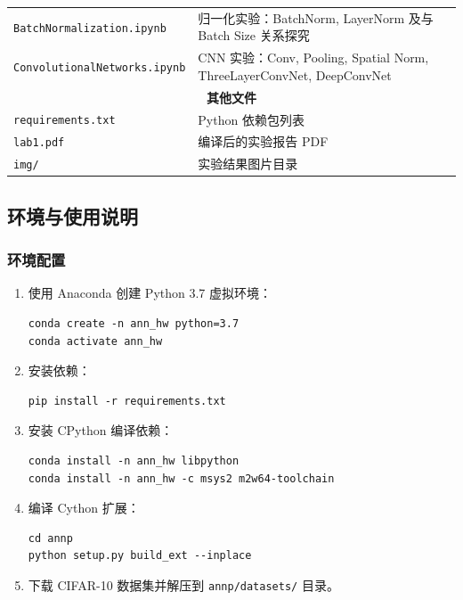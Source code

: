 \documentclass[a4paper]{article}
\begin{document}
\begin{longtable}{l|l}
\texttt{BatchNormalization.ipynb} & 归一化实验：BatchNorm, LayerNorm 及与 Batch Size 关系探究 \\
\texttt{ConvolutionalNetworks.ipynb} & CNN 实验：Conv, Pooling, Spatial Norm, ThreeLayerConvNet, DeepConvNet \\
\midrule
\multicolumn{2}{c}{\textbf{其他文件}} \\
\midrule
\texttt{requirements.txt} & Python 依赖包列表 \\
\texttt{lab1.pdf} & 编译后的实验报告 PDF \\
\texttt{img/} & 实验结果图片目录 \\
\bottomrule
\end{longtable}

\subsection{环境与使用说明}

\subsubsection{环境配置}

\begin{enumerate}
    \item 使用 Anaconda 创建 Python 3.7 虚拟环境：
    \begin{lstlisting}
conda create -n ann_hw python=3.7
conda activate ann_hw
    \end{lstlisting}
    
    \item 安装依赖：
    \begin{lstlisting}
pip install -r requirements.txt
    \end{lstlisting}
    
    \item 安装 CPython 编译依赖：
    \begin{lstlisting}
conda install -n ann_hw libpython
conda install -n ann_hw -c msys2 m2w64-toolchain
    \end{lstlisting}
    
    \item 编译 Cython 扩展：
    \begin{lstlisting}
cd annp
python setup.py build_ext --inplace
    \end{lstlisting}
    
    \item 下载 CIFAR-10 数据集并解压到 \texttt{annp/datasets/} 目录。
\end{enumerate}
\end{document}
